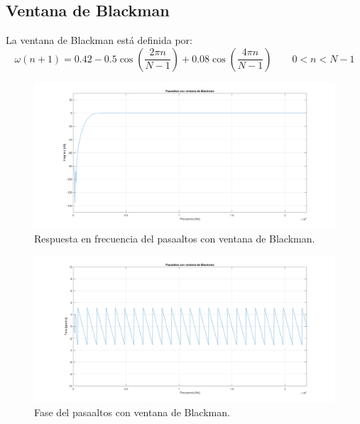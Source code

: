 \subsection{Ventana de Blackman}
La ventana de Blackman está definida por:
\begin{equation}
    \omega (n+1)=0.42-0.5\cos\left(\frac{2\pi n}{N-1} \right)+0.08\cos\left(\frac{4\pi n}{N-1} \right)  \qquad  0<n<N-1
\end{equation}
\begin{figure}[H]
  \includegraphics[scale=.35]{./images/1/blakmod.png}
  \caption{Respuesta en frecuencia del pasaaltos con ventana de Blackman.}
\end{figure}
\begin{figure}[H]
  \includegraphics[scale=.35]{./images/1/blakfase.png}
  \caption{Fase del pasaaltos con ventana de Blackman.}
\end{figure}


